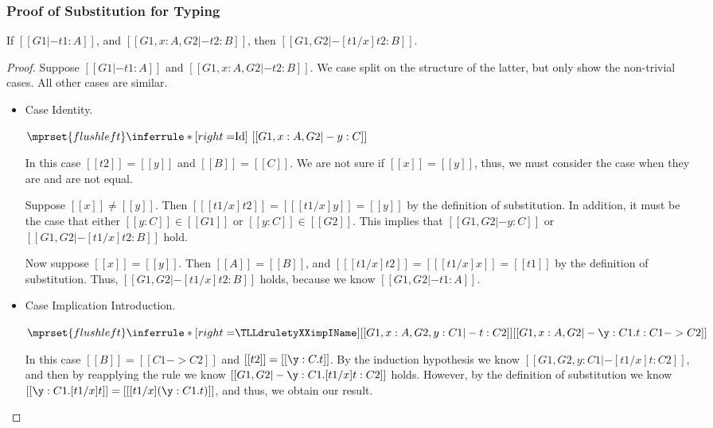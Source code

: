 \subsubsection{Proof of Substitution for Typing}
\label{sec:proof_of_lemma:substitution_for_typing}

\begin{lemma*}
  If $[[G1 |- t1 : A]]$, and $[[G1, x : A,G2 |- t2 : B]]$, then $[[G1,G2 |- [t1/x]t2 : B]]$.
\end{lemma*}

\begin{proof}
  Suppose $[[G1 |- t1 : A]]$ and $[[G1, x : A,G2 |- t2 : B]]$.  We
  case split on the structure of the latter, but only show the
  non-trivial cases.  All other cases are similar.
\begin{itemize}
\item[] Case Identity.\\ 
  \begin{center}
    \begin{math}
      $$\mprset{flushleft}
      \inferrule* [right=$\text{Id}$] {
        \ 
      }{[[G1, x : A,G2 |- y : C]]}
    \end{math}
  \end{center}
  In this case $[[t2]] = [[y]]$ and $[[B]] = [[C]]$.  We are not
  sure if $[[x]] = [[y]]$, thus, we must consider the case when they
  are and are not equal.

  Suppose $[[x]] \neq [[y]]$.  Then $[[ [t1/x]t2]] = [[ [t1/x]y]] =
  [[y]]$ by the definition of substitution.  In addition, it must be
  the case that either $[[y : C]] \in [[G1]]$ or $[[y : C]] \in
  [[G2]]$.  This implies that $[[G1,G2 |- y : C]]$ or $[[G1,G2 |-
      [t1/x]t2 : B]]$ hold.

  Now suppose $[[x]] = [[y]]$.  Then $[[A]] = [[B]]$, and $[[
      [t1/x]t2]] = [[ [t1/x]x]] = [[t1]]$ by the definition of
  substitution.  Thus, $[[G1,G2 |- [t1/x]t2 : B]]$ holds, because we
  know $[[G1,G2 |- t1 : A]]$.

\item[] Case Implication Introduction.\\ 
  \begin{center}
    \begin{math}
      $$\mprset{flushleft}
      \inferrule* [right=$\TLLdruletyXXimpIName$] {
        [[G1, x : A,G2,y : C1 |- t : C2]]
      }{[[G1, x : A,G2 |- \y:C1.t : C1 -> C2]]}
    \end{math}
  \end{center}
  In this case $[[B]] = [[C1 -> C2]]$ and $[[t2]] = [[\y:C.t]]$.  By the induction hypothesis
  we know $[[G1, G2,y : C1 |- [t1/x]t : C2]]$, and then by reapplying the rule we know
  $[[G1, G2 |- \y:C1.[t1/x]t : C2]]$ holds.  However, by the definition of substitution
  we know $[[\y:C1.[t1/x]t]] = [[ [t1/x](\y:C1.t)]]$, and thus, we obtain our result.


\end{itemize}
\end{proof}
